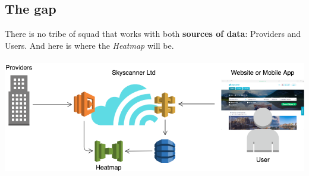 \subsection{The gap}

There is no tribe of squad that works with both \textbf{sources of data}: Providers and Users. And here is where the \textit{Heatmap} will be.
\\\\
\includegraphics[scale=0.5]{diagrams/state-of-the-art-tribes-hm.png}

